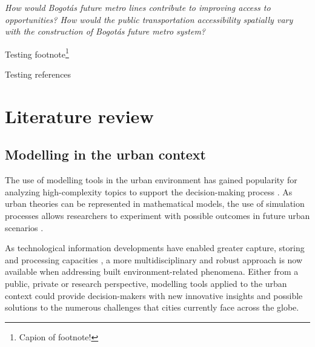 \documentclass[12pt, a4paper]{report}
\begin{document}

\begin{center}
    \textit{How would Bogot\'{a}\textquotesingle s future metro lines contribute to improving access to opportunities? How would the public transportation accessibility spatially vary with the construction of Bogot\'{a}\textquotesingle s future metro system?}
\end{center}




Testing footnote\footnote{Capion of footnote!}

Testing references \citep{alcaldiamayordebogotad.c.EstacionesPrimeraLinea2022}


\chapter{Literature review} \label{Chap2}

\section{Modelling in the urban context}

The use of modelling tools in the urban environment has gained popularity for analyzing high-complexity topics to support the decision-making process \citep{houApproachBuildingOccupancy2020}. As urban theories can be represented in mathematical models, the use of simulation processes allows researchers to experiment with possible outcomes in future urban scenarios \citep{battyUrbanModeling2009a}.

As technological information developments have enabled greater capture, storing and processing capacities \citep{krainesIntegratingDistributedComputational2011}, a more multidisciplinary and robust approach is now available when addressing built environment-related phenomena. Either from a public, private or research perspective, modelling tools applied to the urban context could provide decision-makers with new innovative insights and possible solutions to the numerous challenges that cities currently face across the globe.
\end{document}
